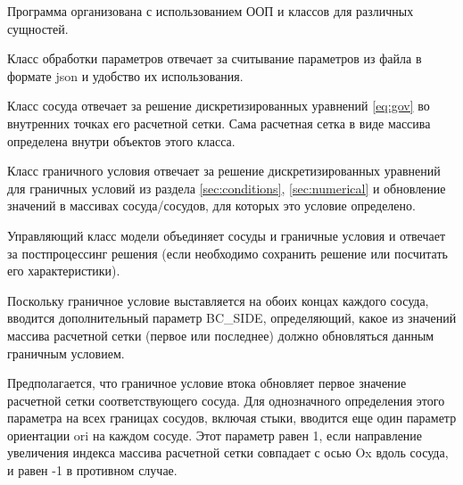 \documentclass[12pt]{article}
\begin{document}
Программа организована с использованием ООП и классов для различных сущностей.

Класс обработки параметров отвечает за считывание параметров из файла в формате json и удобство их использования.

Класс сосуда отвечает за решение дискретизированных уравнений \eqref{eq:gov} во внутренних точках его расчетной сетки. Сама расчетная сетка в виде массива определена внутри объектов этого класса.

Класс граничного условия отвечает за решение дискретизированных уравнений для граничных условий из раздела \ref{sec:conditions}, \ref{sec:numerical} и обновление значений в массивах сосуда/сосудов, для которых это условие определено.

Управляющий класс модели объединяет сосуды и граничные условия и отвечает за постпроцессинг решения (если необходимо сохранить решение или посчитать его характеристики).

Поскольку граничное условие выставляется на обоих концах каждого сосуда, вводится дополнительный параметр \textrm{BC\_SIDE}, определяющий, какое из значений массива расчетной сетки (первое или последнее) должно обновляться данным граничным условием.

Предполагается, что граничное условие втока обновляет первое значение расчетной сетки соответствующего сосуда. 
Для однозначного определения этого параметра на всех границах сосудов, включая стыки, вводится еще один параметр ориентации \textrm{ori} на каждом сосуде. Этот параметр равен 1, если направление увеличения индекса массива расчетной сетки совпадает с осью Ox вдоль сосуда, и равен -1 в противном случае.
\end{document}
